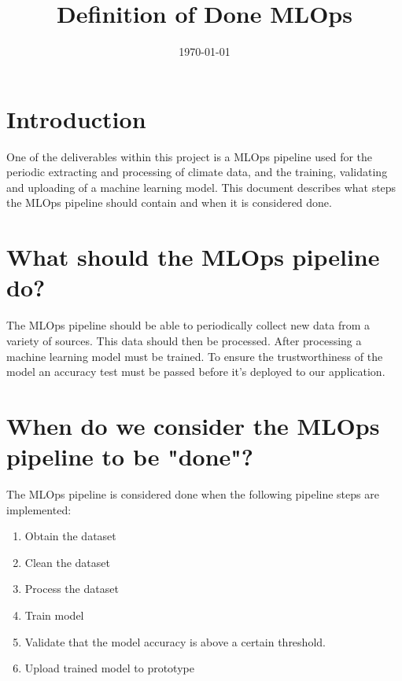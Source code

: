 \documentclass[12pt, letterpaper]{article}
\title{Definition of Done MLOps}
\author{}
\date{\today}
\begin{document}
	
\maketitle

\newpage

\section{Introduction}
One of the deliverables within this project is a MLOps pipeline used for the periodic extracting and processing of climate data, and the training, validating and uploading of a machine learning model. This document describes what steps the MLOps pipeline should contain and when it is considered done.

\section{What should the MLOps pipeline do?}
The MLOps pipeline should be able to periodically collect new data from a variety of sources. This data should then be processed. After processing a machine learning model must be trained. To ensure the trustworthiness of the model an accuracy test must be passed before it's deployed to our application.

\section{When do we consider the MLOps pipeline to be "done"?}
The MLOps pipeline is considered done when the following pipeline steps are implemented:

\begin{enumerate}
	\item Obtain the dataset
	\item Clean the dataset
	\item Process the dataset
	\item Train model
	\item Validate that the model accuracy is above a certain threshold.
	\item Upload trained model to prototype
\end{enumerate}
	
\end{document}

